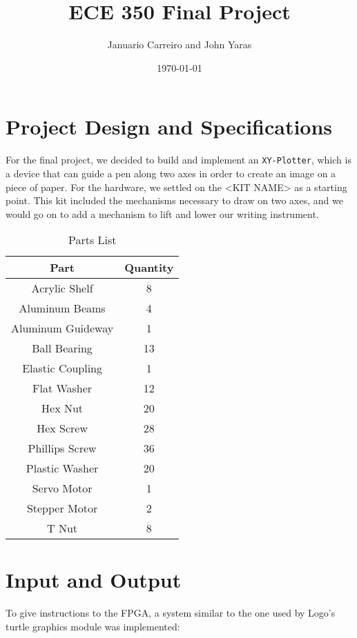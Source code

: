 \documentclass[12pt]{article}
\begin{document}
\title{ECE 350 Final Project}
\author{Januario Carreiro and John Yaras}
\date{\today}

\maketitle

\thispagestyle{fancy}

\newpage

\section{Project Design and Specifications}
For the final project, we decided to build and implement an {\tt XY-Plotter}, which is a device that can guide a pen along two axes in order to create an image on a piece of paper. For the hardware, we settled on the <KIT NAME> as a starting point. This kit included the mechanisms necessary to draw on two axes, and we would go on to add a mechanism to lift and lower our writing instrument.

\begin{table}[ht!]
\centering
\begin{tabular}{|c|c|} \hline
Part & Quantity \\ \hline \hline
Acrylic Shelf & 8 \\ \hline
Aluminum Beams & 4 \\ \hline
Aluminum Guideway & 1 \\ \hline
Ball Bearing & 13 \\ \hline
Elastic Coupling & 1 \\ \hline
Flat Washer & 12 \\ \hline
Hex Nut & 20 \\ \hline
Hex Screw & 28 \\ \hline
Phillips Screw & 36 \\ \hline
Plastic Washer & 20 \\ \hline
Servo Motor & 1 \\ \hline
Stepper Motor & 2 \\ \hline
T Nut & 8 \\ \hline
\end{tabular}
\caption{Parts List}
\end{table}


\section{Input and Output}
To give instructions to the FPGA, a system similar to the one used by Logo's turtle graphics module was implemented:
\end{document}
